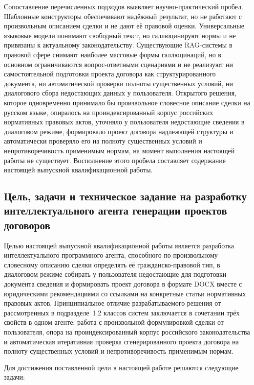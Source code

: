Сопоставление перечисленных подходов выявляет научно-практический пробел. Шаблонные конструкторы обеспечивают надёжный результат, но не работают с произвольным описанием сделки и не дают её правовой оценки. Универсальные языковые модели понимают свободный текст, но галлюцинируют нормы и не привязаны к актуальному законодательству. Существующие RAG-системы в правовой сфере снимают наиболее массовые формы галлюцинаций, но в основном ограничиваются вопрос-ответными сценариями и не реализуют ни самостоятельной подготовки проекта договора как структурированного документа, ни автоматической проверки полноты существенных условий, ни диалогового сбора недостающих данных у пользователя. Открытого решения, которое одновременно принимало бы произвольное словесное описание сделки на русском языке, опиралось на проиндексированный корпус российских нормативных правовых актов, уточняло у пользователя недостающие сведения в диалоговом режиме, формировало проект договора надлежащей структуры и автоматически проверяло его на полноту существенных условий и непротиворечивость применимым нормам, на момент выполнения настоящей работы не существует. Восполнение этого пробела составляет содержание настоящей выпускной квалификационной работы.

\subsection{Цель, задачи и техническое задание на разработку интеллектуального агента генерации проектов договоров}

Целью настоящей выпускной квалификационной работы является разработка интеллектуального программного агента, способного по произвольному словесному описанию сделки определять её гражданско-правовой тип, в диалоговом режиме собирать у пользователя недостающие для подготовки документа сведения и формировать проект договора в формате DOCX вместе с юридическими рекомендациями со ссылками на конкретные статьи нормативных правовых актов. Принципиальное отличие разрабатываемого решения от рассмотренных в подразделе~1.2 классов систем заключается в сочетании трёх свойств в одном агенте: работа с произвольной формулировкой сделки от пользователя, опора на проиндексированный корпус российского законодательства и автоматическая итеративная проверка сгенерированного проекта договора на полноту существенных условий и непротиворечивость применимым нормам.

Для достижения поставленной цели в настоящей работе решаются следующие задачи:

